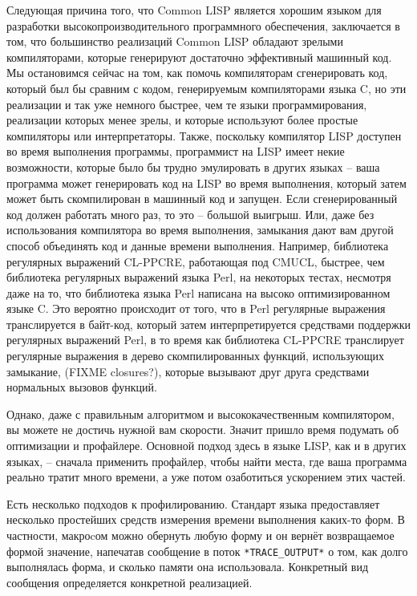 Следующая причина того, что Common LISP является хорошим языком для разработки
высокопроизводительного программного обеспечения, заключается в том, что большинство
реализаций Common LISP обладают зрелыми компиляторами, которые генерируют достаточно
эффективный машинный код. Мы остановимся сейчас на том, как помочь компиляторам
сгенерировать код, который был бы сравним с кодом, генерируемым компиляторами языка C, но
эти реализации и так уже немного быстрее, чем те языки программирования, реализации
которых менее зрелы, и которые используют более простые компиляторы или
интерпретаторы. Также, поскольку компилятор LISP доступен во время выполнения программы,
программист на LISP имеет некие возможности, которые было бы трудно эмулировать в других
языках -- ваша программа может генерировать код на LISP во время выполнения, который затем
может быть скомпилирован в машинный код и запущен. Если сгенерированный код должен
работать много раз, то это -- большой выигрыш. Или, даже без использования компилятора во
время выполнения, замыкания дают вам другой способ объединять код и данные времени
выполнения. Например, библиотека регулярных выражений CL-PPCRE, работающая под CMUCL,
быстрее, чем библиотека регулярных выражений языка Perl, на некоторых тестах, несмотря
даже на то, что библиотека языка Perl написана на высоко оптимизированном языке C. Это
вероятно происходит от того, что в Perl регулярные выражения транслируется в байт-код,
который затем интерпретируется средствами поддержки регулярных выражений Perl, в то время
как библиотека CL-PPCRE транслирует регулярные выражения в дерево скомпилированных
функций, использующих замыкание, (FIXME closures?), которые вызывают друг друга средствами
нормальных вызовов функций.

Однако, даже с правильным алгоритмом и высококачественным компилятором, вы можете не
достичь нужной вам скорости. Значит пришло время подумать об оптимизации и
профайлере. Основной подход здесь в языке LISP, как и в других языках, -- сначала
применить профайлер, чтобы найти места, где ваша программа реально тратит много времени, а
уже потом озаботиться ускорением этих частей.

Есть несколько подходов к профилированию. Стандарт языка предоставляет несколько
простейших средств измерения времени выполнения каких-то форм. В частности, макроcом
 можно обернуть любую форму и он вернёт возвращаемое формой значение, напечатав
сообщение в поток \lstinline!*TRACE_OUTPUT*! о том, как долго выполнялась форма, и сколько
памяти она использовала. Конкретный вид сообщения определяется конкретной реализацией.

